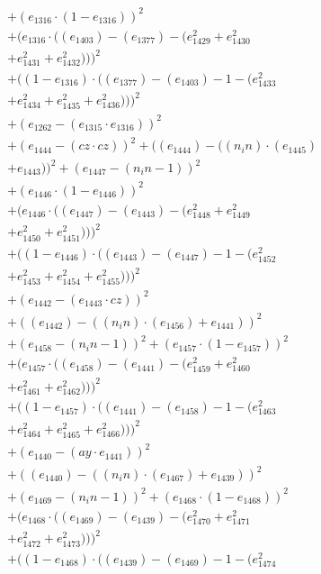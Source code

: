 \documentclass[10pt, a4paper]{article}
\begin{document}
\begin{small}
\begin{align*}
& + (e_{1316}  \cdot  (1 - e_{1316}))^{2} \\
& + (e_{1316}  \cdot  ((e_{1403}) - (e_{1377}) - (e_{1429}^{2} + e_{1430}^{2} \\
& + e_{1431}^{2} + e_{1432}^{2})))^{2} \\
& + ((1 - e_{1316})  \cdot  ((e_{1377}) - (e_{1403}) - 1 - (e_{1433}^{2} \\
& + e_{1434}^{2} + e_{1435}^{2} + e_{1436}^{2})))^{2} \\
& + (e_{1262} - (e_{1315}  \cdot  e_{1316}))^{2} \\
& + (e_{1444} - (cz  \cdot  cz))^{2} + ((e_{1444}) - ((n_in)  \cdot  (e_{1445}) \\
& + e_{1443}))^{2} + (e_{1447} - (n_in - 1))^{2} \\
& + (e_{1446}  \cdot  (1 - e_{1446}))^{2} \\
& + (e_{1446}  \cdot  ((e_{1447}) - (e_{1443}) - (e_{1448}^{2} + e_{1449}^{2} \\
& + e_{1450}^{2} + e_{1451}^{2})))^{2} \\
& + ((1 - e_{1446})  \cdot  ((e_{1443}) - (e_{1447}) - 1 - (e_{1452}^{2} \\
& + e_{1453}^{2} + e_{1454}^{2} + e_{1455}^{2})))^{2} \\
& + (e_{1442} - (e_{1443}  \cdot  cz))^{2} \\
& + ((e_{1442}) - ((n_in)  \cdot  (e_{1456}) + e_{1441}))^{2} \\
& + (e_{1458} - (n_in - 1))^{2} + (e_{1457}  \cdot  (1 - e_{1457}))^{2} \\
& + (e_{1457}  \cdot  ((e_{1458}) - (e_{1441}) - (e_{1459}^{2} + e_{1460}^{2} \\
& + e_{1461}^{2} + e_{1462}^{2})))^{2} \\
& + ((1 - e_{1457})  \cdot  ((e_{1441}) - (e_{1458}) - 1 - (e_{1463}^{2} \\
& + e_{1464}^{2} + e_{1465}^{2} + e_{1466}^{2})))^{2} \\
& + (e_{1440} - (ay  \cdot  e_{1441}))^{2} \\
& + ((e_{1440}) - ((n_in)  \cdot  (e_{1467}) + e_{1439}))^{2} \\
& + (e_{1469} - (n_in - 1))^{2} + (e_{1468}  \cdot  (1 - e_{1468}))^{2} \\
& + (e_{1468}  \cdot  ((e_{1469}) - (e_{1439}) - (e_{1470}^{2} + e_{1471}^{2} \\
& + e_{1472}^{2} + e_{1473}^{2})))^{2} \\
& + ((1 - e_{1468})  \cdot  ((e_{1439}) - (e_{1469}) - 1 - (e_{1474}^{2} \\

\end{align*}
\end{small}
\end{document}
